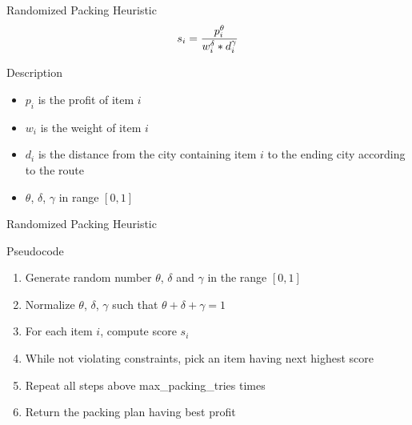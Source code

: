 \documentclass[aspectratio=169]{beamer}
\begin{document}
\begin{frame}{Randomized Packing Heuristic}
$$s_i = {p_i^\theta \over w_i^\delta * d_i^\gamma}$$
\begin{block}{Description}
\begin{itemize}
\vspace{0.2cm}
    \item $p_i$ is the profit of item $i$
\vspace{0.2cm}
    \item $w_i$ is the weight of item $i$
\vspace{0.2cm}
    \item $d_i$ is the distance from the city containing item $i$ to the ending city according to the route
\vspace{0.2cm}
    \item $\theta$, $\delta$, $\gamma$ in range $[0, 1]$
\end{itemize}
\vspace{0.2cm}
\end{block}
\end{frame}

\begin{frame}{Randomized Packing Heuristic}

\begin{block}{Pseudocode}
    \begin{enumerate}
        \vspace{0.2cm}
        \item Generate random number $\theta$, $\delta$ and $\gamma$ in the range $[0, 1]$
        \pause
        \vspace{0.2cm}
        \item Normalize $\theta$, $\delta$, $\gamma$ such that $\theta + \delta + \gamma = 1$
        \pause
        \vspace{0.2cm}
        \item For each item $i$, compute score $s_i$
        \pause
        \vspace{0.2cm}
        \item While not violating constraints, pick an item having next highest score
        \pause
        \vspace{0.2cm}
        \item Repeat all steps above max\_packing\_tries times
        \vspace{0.2cm}
        \item Return the packing plan having best profit
        \vspace{0.2cm}
    \end{enumerate}
\end{block}
\end{frame}
\end{document}
